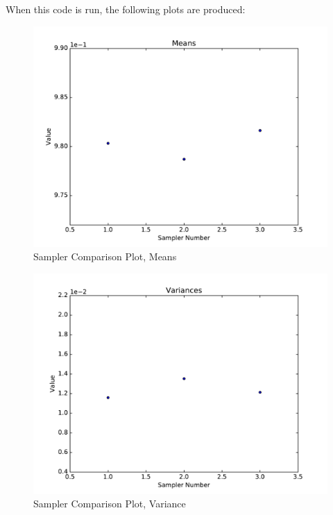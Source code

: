 When this code is run, the following plots are produced:
\begin{figure}[h!]
  \centering
  \includegraphics[width=0.7\linewidth]{../../tests/framework/user_guide/StatisticalAnalysis/comparingSamplers/meanPlotter_scatter}
  \caption{Sampler Comparison Plot, Means}
\end{figure}
\begin{figure}[h!]
  \centering
  \includegraphics[width=0.7\linewidth]{../../tests/framework/user_guide/StatisticalAnalysis/comparingSamplers/varPlotter_scatter}
  \caption{Sampler Comparison Plot, Variance}
\end{figure}


